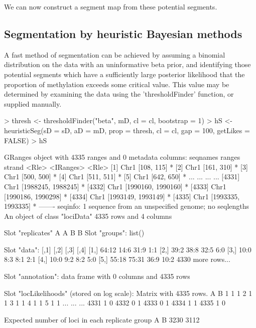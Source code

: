 \documentclass[a4paper]{article}
\begin{document}
We can now construct a segment map from these potential segments.

\subsection*{Segmentation by heuristic Bayesian methods}

A fast method of segmentation can be achieved by assuming a binomial distribution on the data with an uninformative beta prior, and identifying those potential segments which have a sufficiently large posterior likelihood that the proportion of methylation exceeds some critical value. This value may be determined by examining the data using the 'thresholdFinder' function, or supplied manually.

\begin{Schunk}
\begin{Sinput}
> thresh <- thresholdFinder("beta", mD, cl = cl, bootstrap = 1)
> hS <- heuristicSeg(sD = sD, aD = mD, prop = thresh, cl = cl, gap = 100, getLikes = FALSE)
> hS
\end{Sinput}
\begin{Soutput}
GRanges object with 4335 ranges and 0 metadata columns:
         seqnames             ranges strand
            <Rle>          <IRanges>  <Rle>
     [1]     Chr1         [108, 115]      *
     [2]     Chr1         [161, 310]      *
     [3]     Chr1         [500, 500]      *
     [4]     Chr1         [511, 511]      *
     [5]     Chr1         [642, 650]      *
     ...      ...                ...    ...
  [4331]     Chr1 [1988245, 1988245]      *
  [4332]     Chr1 [1990160, 1990160]      *
  [4333]     Chr1 [1990186, 1990298]      *
  [4334]     Chr1 [1993149, 1993149]      *
  [4335]     Chr1 [1993335, 1993335]      *
  -------
  seqinfo: 1 sequence from an unspecified genome; no seqlengths
An object of class "lociData"
4335 rows and 4 columns

Slot "replicates"
A A B B
Slot "groups":
list()

Slot "data":
     [,1]  [,2]  [,3] [,4]
[1,] 64:12 14:6  31:9 1:1 
[2,] 39:2  38:8  32:5 6:0 
[3,] 10:0  8:3   8:1  2:1 
[4,] 10:0  9:2   8:2  5:0 
[5,] 55:18 75:31 36:9 10:2
4330 more rows...

Slot "annotation":
data frame with 0 columns and 4335 rows

Slot "locLikelihoods" (stored on log scale):
Matrix with  4335  rows.
       A   B
1      1   1
2      1   1
3      1   1
4      1   1
5      1   1
...  ... ...
4331   1   0
4332   0   1
4333   0   1
4334   1   1
4335   1   0

Expected number of loci in each replicate group
   A    B 
3230 3112 
\end{Soutput}
\end{Schunk}
\end{document}
